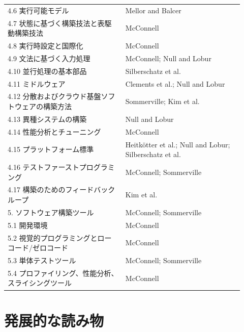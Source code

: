 \documentclass[a4paper,11pt,ja=standard,xelatex]{bxjsarticle}
\begin{document}
\begin{longtable}{L{0.46\linewidth}L{0.46\linewidth}}
4.6 実行可能モデル & Mellor and Balcer \\
4.7 状態に基づく構築技法と表駆動構築技法 & McConnell \\
4.8 実行時設定と国際化 & McConnell \\
4.9 文法に基づく入力処理 & McConnell; Null and Lobur \\
4.10 並行処理の基本部品 & Silberschatz et al. \\
4.11 ミドルウェア & Clements et al.; Null and Lobur \\
4.12 分散およびクラウド基盤ソフトウェアの構築方法 & Sommerville; Kim et al. \\
4.13 異種システムの構築 & Null and Lobur \\
4.14 性能分析とチューニング & McConnell \\
4.15 プラットフォーム標準 & Heitkötter et al.; Null and Lobur; Silberschatz et al. \\
4.16 テストファーストプログラミング & McConnell; Sommerville \\
4.17 構築のためのフィードバックループ & Kim et al. \\
5. ソフトウェア構築ツール & McConnell; Sommerville \\
5.1 開発環境 & McConnell \\
5.2 視覚的プログラミングとローコード/ゼロコード & McConnell \\
5.3 単体テストツール & McConnell; Sommerville \\
5.4 プロファイリング、性能分析、スライシングツール & McConnell \\
\bottomrule
\end{longtable}

\section{発展的な読み物}
\end{document}

